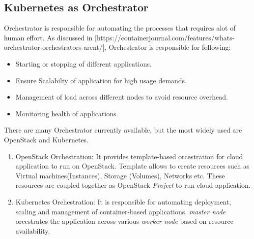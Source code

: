 \subsection{Kubernetes as Orchestrator}
\label{sec:k8s_orchestrator}
Orchestrator is responsible for automating the processes that requires alot of human effort. As discussed in [https://containerjournal.com/features/whats-orchestrator-orchestrators-arent/], Orchestrator is responsible for following:
\begin{itemize}
  \item Starting or stopping of different applications.
  \item Ensure Scalabilty of application for high usage demands.
  \item Management of load across different nodes to avoid resource overhead.
  \item Monitoring health of applications.
\end{itemize}
There are many Orchestrator currently available, but the most widely used are OpenStack and Kubernetes.
\begin{enumerate}
  \item OpenStack Orchestration: It provides template-based orcestration for cloud application to run on OpenStack. Template allows to create resources such as Virtual machines(Instances), Storage (Volumes), Networks etc. These resources are coupled together as OpenStack \emph{Project} to run cloud application\cite{openstack-orchestration}.
  \item Kubernetes Orchestration: It is responsible for automating deployment, scaling and management of container-based applications. \emph{master node} orcestrates the application across various \emph{worker node} based on resource availability.
\end{enumerate}
